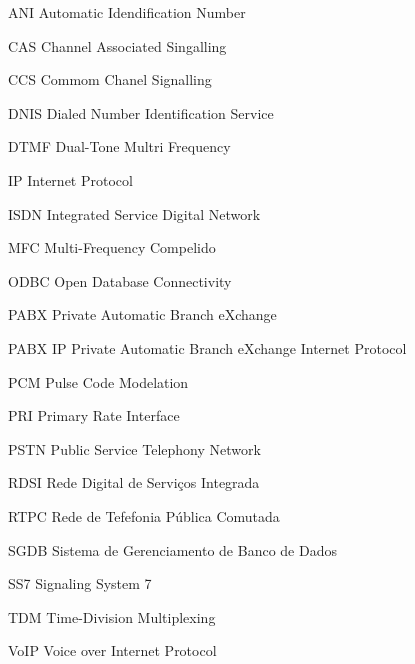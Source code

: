 \documentclass[12pt,openright,oneside,a4paper,brazil]{abntex2}
\begin{document}

\frenchspacing 







\listoffigures*
\cleardoublepage





\begin{siglas}
  \item[ANI]	 Automatic Idendification Number
  \item[CAS]	 Channel Associated Singalling
  \item[CCS]	 Commom Chanel Signalling
  \item[DNIS]	 Dialed Number Identification Service
  \item[DTMF]	 Dual-Tone Multri Frequency
  \item[IP]		 Internet Protocol
  \item[ISDN]	 Integrated Service Digital Network
  \item[MFC]	 Multi-Frequency Compelido
  \item[ODBC]	 Open Database Connectivity
  \item[PABX]	 Private Automatic Branch eXchange
  \item[PABX IP] Private Automatic Branch eXchange Internet Protocol
  \item[PCM]	 Pulse Code Modelation
  \item[PRI]	 Primary Rate Interface
  \item[PSTN]	 Public Service Telephony Network
  \item[RDSI]	 Rede Digital de Serviços Integrada
  \item[RTPC]	 Rede de Tefefonia Pública Comutada
  \item[SGDB]	 Sistema de Gerenciamento de Banco de Dados
  \item[SS7]	 Signaling System 7
  \item[TDM]	 Time-Division Multiplexing
  \item[VoIP]	 Voice over Internet Protocol
\end{siglas}
\end{document}
